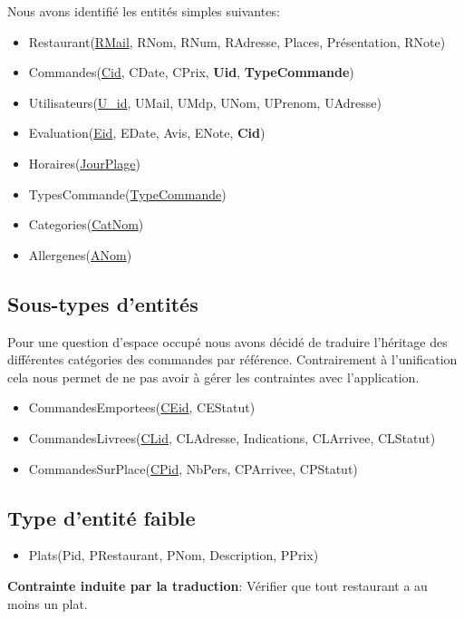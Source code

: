 \documentclass[10pt, a4paper]{article}
\begin{document}
Nous avons identifié les entités simples suivantes:

\begin{itemize}
    \item Restaurant\@(\underline{RMail}, RNom, RNum, RAdresse, Places, Présentation, RNote)
    \item Commandes\@(\underline{Cid}, CDate, CPrix, \textbf{Uid}, \textbf{TypeCommande})
    \item Utilisateurs\@(\underline{U\_id}, UMail, UMdp, UNom, UPrenom, UAdresse)
    \item Evaluation\@(\underline{Eid}, EDate, Avis, ENote, \textbf{Cid})
    \item Horaires\@(\underline{JourPlage})
    \item TypesCommande\@(\underline{TypeCommande})
    \item Categories\@(\underline{CatNom})
    \item Allergenes\@(\underline{ANom})
\end{itemize}

\subsection{Sous-types d'entités}

Pour une question d'espace occupé nous avons décidé de traduire l'héritage des différentes catégories des commandes par référence. 
Contrairement à l'unification cela nous permet de ne pas avoir à gérer les contraintes avec l'application.

\begin{itemize}
    \item CommandesEmportees\@(\underline{CEid}, CEStatut)
    \item CommandesLivrees\@(\underline{CLid}, CLAdresse, Indications, CLArrivee, CLStatut)
    \item CommandesSurPlace\@(\underline{CPid}, NbPers, CPArrivee, CPStatut)
\end{itemize}

\subsection{Type d'entité faible}

\begin{itemize}
    \item Plats\@(Pid, PRestaurant, PNom, Description, PPrix)
\end{itemize}

\textbf{Contrainte induite par la traduction}: Vérifier que tout restaurant a au moins un plat.
\end{document}
